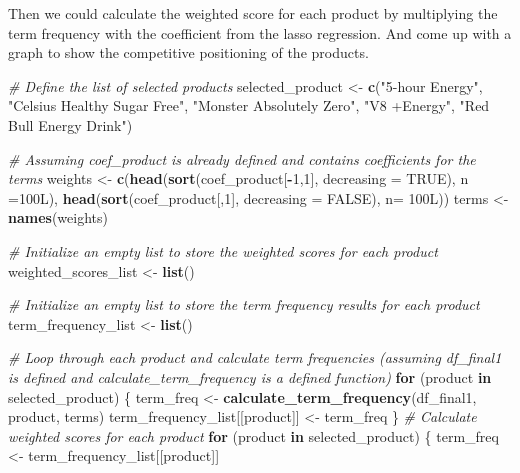 \documentclass[
]{article}
\newenvironment{Shaded}{\begin{snugshade}}{\end{snugshade}}
\newcommand{\AttributeTok}[1]{\textcolor[rgb]{0.13,0.29,0.53}{#1}}
\newcommand{\CommentTok}[1]{\textcolor[rgb]{0.56,0.35,0.01}{\textit{#1}}}
\newcommand{\ConstantTok}[1]{\textcolor[rgb]{0.56,0.35,0.01}{#1}}
\newcommand{\ControlFlowTok}[1]{\textcolor[rgb]{0.13,0.29,0.53}{\textbf{#1}}}
\newcommand{\DecValTok}[1]{\textcolor[rgb]{0.00,0.00,0.81}{#1}}
\newcommand{\FunctionTok}[1]{\textcolor[rgb]{0.13,0.29,0.53}{\textbf{#1}}}
\newcommand{\NormalTok}[1]{#1}
\newcommand{\OtherTok}[1]{\textcolor[rgb]{0.56,0.35,0.01}{#1}}
\newcommand{\SpecialCharTok}[1]{\textcolor[rgb]{0.81,0.36,0.00}{\textbf{#1}}}
\newcommand{\StringTok}[1]{\textcolor[rgb]{0.31,0.60,0.02}{#1}}
\begin{document}
Then we could calculate the weighted score for each product by
multiplying the term frequency with the coefficient from the lasso
regression. And come up with a graph to show the competitive positioning
of the products.

\begin{Shaded}
\begin{Highlighting}[]
\CommentTok{\# Define the list of selected products}
\NormalTok{selected\_product }\OtherTok{\textless{}{-}} \FunctionTok{c}\NormalTok{(}\StringTok{"5{-}hour Energy"}\NormalTok{, }\StringTok{"Celsius Healthy Sugar Free"}\NormalTok{, }\StringTok{"Monster Absolutely Zero"}\NormalTok{, }\StringTok{"V8 +Energy"}\NormalTok{, }\StringTok{"Red Bull Energy Drink"}\NormalTok{)}

\CommentTok{\# Assuming coef\_product is already defined and contains coefficients for the terms}
\NormalTok{weights }\OtherTok{\textless{}{-}} \FunctionTok{c}\NormalTok{(}\FunctionTok{head}\NormalTok{(}\FunctionTok{sort}\NormalTok{(coef\_product[}\SpecialCharTok{{-}}\DecValTok{1}\NormalTok{,}\DecValTok{1}\NormalTok{], }\AttributeTok{decreasing =} \ConstantTok{TRUE}\NormalTok{), }\AttributeTok{n =}\NormalTok{100L), }\FunctionTok{head}\NormalTok{(}\FunctionTok{sort}\NormalTok{(coef\_product[,}\DecValTok{1}\NormalTok{], }\AttributeTok{decreasing =} \ConstantTok{FALSE}\NormalTok{), }\AttributeTok{n=}\NormalTok{ 100L))}
\NormalTok{terms }\OtherTok{\textless{}{-}} \FunctionTok{names}\NormalTok{(weights)}


\CommentTok{\# Initialize an empty list to store the weighted scores for each product}
\NormalTok{weighted\_scores\_list }\OtherTok{\textless{}{-}} \FunctionTok{list}\NormalTok{()}

\CommentTok{\# Initialize an empty list to store the term frequency results for each product}
\NormalTok{term\_frequency\_list }\OtherTok{\textless{}{-}} \FunctionTok{list}\NormalTok{()}

\CommentTok{\# Loop through each product and calculate term frequencies (assuming df\_final1 is defined and calculate\_term\_frequency is a defined function)}
\ControlFlowTok{for}\NormalTok{ (product }\ControlFlowTok{in}\NormalTok{ selected\_product) \{}
\NormalTok{  term\_freq }\OtherTok{\textless{}{-}} \FunctionTok{calculate\_term\_frequency}\NormalTok{(df\_final1, product, terms)}
\NormalTok{  term\_frequency\_list[[product]] }\OtherTok{\textless{}{-}}\NormalTok{ term\_freq}
\NormalTok{\}}
\CommentTok{\# Calculate weighted scores for each product}
\ControlFlowTok{for}\NormalTok{ (product }\ControlFlowTok{in}\NormalTok{ selected\_product) \{}
\NormalTok{  term\_freq }\OtherTok{\textless{}{-}}\NormalTok{ term\_frequency\_list[[product]]}
  

\end{Highlighting}
\end{Shaded}
\end{document}
